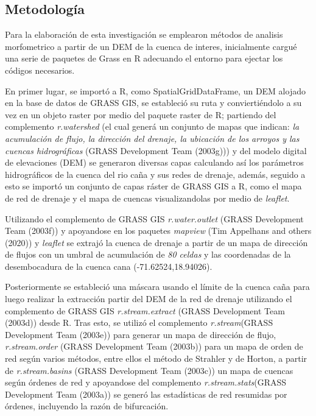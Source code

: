 \documentclass[11pt,]{article}
\begin{document}
\subsection{Metodología}\label{metodologuxeda-1}

Para la elaboración de esta investigación se emplearon métodos de
analisis morfometrico a partir de un DEM de la cuenca de interes,
inicialmente cargué una serie de paquetes de Grass en R adecuando el
entorno para ejectar los códigos necesarios.

En primer lugar, se importó a R, como SpatialGridDataFrame, un DEM
alojado en la base de datos de GRASS GIS, se estableció su ruta y
conviertiéndolo a su vez en un objeto raster por medio del paquete
raster de R; partiendo del complemento \emph{r.watershed} (el cual
generá un conjunto de mapas que indican: \emph{la acumulación de flujo,
la dirección del drenaje, la ubicación de los arroyos y las cuencas
hidrográficas} (GRASS Development Team (2003g))) y del modelo digital de
elevaciones (DEM) se generaron diversas capas calculando así los
parámetros hidrográficos de la cuenca del rio caña y sus redes de
drenaje, además, seguido a esto se importó un conjunto de capas ráster
de GRASS GIS a R, como el mapa de red de drenaje y el mapa de cuencas
visualizandolas por medio de \emph{leaflet}.

Utilizando el complemento de GRASS GIS \emph{r.water.outlet} (GRASS
Development Team (2003f)) y apoyandose en los paquetes \emph{mapview}
(Tim Appelhans and others (2020)) y \emph{leaflet} se extrajó la cuenca
de drenaje a partir de un mapa de dirección de flujos con un umbral de
acumulación de \emph{80 celdas} y las coordenadas de la desembocadura de
la cuenca cana (-71.62524,18.94026).

Posteriormente se estableció una máscara usando el límite de la cuenca
caña para luego realizar la extracción partir del DEM de la red de
drenaje utilizando el complemento de GRASS GIS \emph{r.stream.extract}
(GRASS Development Team (2003d)) desde R. Tras esto, se utilizó el
complemento \emph{r.stream}(GRASS Development Team (2003e)) para generar
un mapa de dirección de flujo, \emph{r.stream.order} (GRASS Development
Team (2003b)) para un mapa de orden de red según varios métodos, entre
ellos el método de Strahler y de Horton, a partir de
\emph{r.stream.basins} (GRASS Development Team (2003c)) un mapa de
cuencas según órdenes de red y apoyandose del complemento
\emph{r.stream.stats}(GRASS Development Team (2003a)) se generó las
estadísticas de red resumidas por órdenes, incluyendo la razón de
bifurcación.
\end{document}
